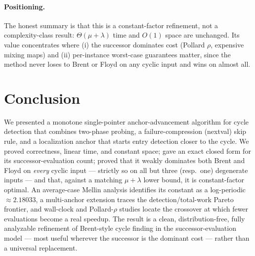 \documentclass[11pt]{article}
\begin{document}
\paragraph{Positioning.}
The honest summary is that this is a constant-factor refinement, not a
complexity-class result: $\Theta(\mu+\lambda)$ time and $O(1)$ space are
unchanged. Its value concentrates where (i) the successor dominates cost
(Pollard $\rho$, expensive mixing maps) and (ii) per-instance worst-case
guarantees matter, since the method never loses to Brent or Floyd on any cyclic
input and wins on almost all.

\section{Conclusion}
\label{sec:conclusion}

We presented a monotone single-pointer anchor-advancement algorithm for cycle
detection that combines two-phase probing, a failure-compression (nextval) skip
rule, and a localization anchor that starts entry detection closer to the cycle.
We proved correctness, linear time, and constant space; gave an exact closed form
for its successor-evaluation count; proved that it weakly dominates both Brent and
Floyd on \emph{every} cyclic input --- strictly so on all but three (resp.\ one)
degenerate inputs --- and that, against a matching $\mu+\lambda$ lower bound, it is
constant-factor optimal. An average-case Mellin analysis identifies its constant
as a log-periodic $\approx2.18033$, a multi-anchor extension traces the
detection/total-work Pareto frontier, and wall-clock and Pollard-$\rho$ studies
locate the crossover at which fewer evaluations become a real speedup. The result
is a clean, distribution-free, fully analyzable refinement of Brent-style cycle
finding in the successor-evaluation model --- most useful wherever the successor
is the dominant cost --- rather than a universal replacement.
\end{document}
